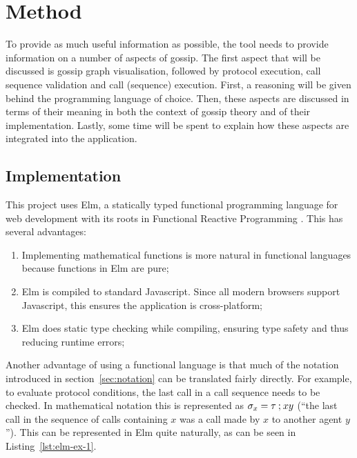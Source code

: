
\section{Method}
\label{sec:method}

To provide as much useful information as possible, the tool needs to provide information on a number of aspects of gossip.
The first aspect that will be discussed is gossip graph visualisation, followed by protocol execution, call sequence validation and call (sequence) execution.
First, a reasoning will be given behind the programming language of choice.
Then, these aspects are discussed in terms of their meaning in both the context of gossip theory and of their implementation.
Lastly, some time will be spent to explain how these aspects are integrated into the application.

\subsection{Implementation}

This project uses Elm, a statically typed functional programming language for web development with its roots in Functional Reactive Programming \parencite{czaplicki_asynchronous_2013}.
This has several advantages:

\begin{enumerate}
    \item Implementing mathematical functions is more natural in functional languages because functions in Elm are pure;
    \item Elm is compiled to standard Javascript. Since all modern browsers support Javascript, this ensures the application is cross-platform;
    \item Elm does static type checking while compiling, ensuring type safety and thus reducing runtime errors;
\end{enumerate}

Another advantage of using a functional language is that much of the notation introduced in section~\ref{sec:notation} can be translated fairly directly.
For example, to evaluate protocol conditions, the last call in a call sequence needs to be checked.
In mathematical notation this is represented as \(\sigma_x = \tau \mathbin{;} xy\) 
(``the last call in the sequence of calls containing \(x\) was a call made by \(x\) to another agent \(y\)'').
This can be represented in Elm quite naturally, as can be seen in Listing~\ref{lst:elm-ex-1}.


